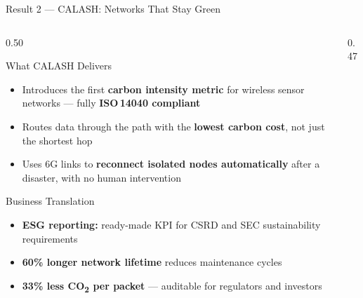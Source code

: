\documentclass[aspectratio=169,t,10pt]{beamer}
\begin{document}
\begin{frame}[shrink=12]{Result 2 --- CALASH: Networks That Stay Green}
\begin{columns}[T]
\begin{column}{0.50\textwidth}
  \begin{block}{\faLeaf\; What CALASH Delivers}
    \begin{itemize}\small\setlength{\itemsep}{2pt}
      \item Introduces the first \textbf{carbon intensity metric}
            for wireless sensor networks ---
            fully \textbf{ISO\,14040 compliant}
      \item Routes data through the path with the
            \textbf{lowest carbon cost}, not just the shortest hop
      \item Uses 6G links to \textbf{reconnect isolated nodes automatically}
            after a disaster, with no human intervention
    \end{itemize}
  \end{block}
  \vspace{1pt}
  \begin{exampleblock}{\faBriefcase\; Business Translation}
    \begin{itemize}\small\setlength{\itemsep}{1pt}
      \item \textbf{ESG reporting:} ready-made KPI for
            CSRD and SEC sustainability requirements
      \item \textbf{60\% longer network lifetime}
            reduces maintenance cycles
      \item \textbf{33\% less CO\textsubscript{2} per packet} ---
            auditable for regulators and investors
    \end{itemize}
  \end{exampleblock}
\end{column}
\begin{column}{0.47\textwidth}
  \centering
\end{column}
\end{columns}
\end{frame}
\end{document}
